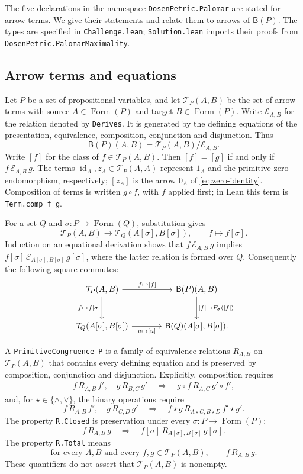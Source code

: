 \documentclass[11pt]{article}
\newcommand{\B}{\mathsf B}
\newcommand{\FormulaSet}{\operatorname{Form}}
\begin{document}
The five declarations in the namespace \texttt{DosenPetric.Palomar}
are stated for arrow terms. We give their statements and relate them
to arrows of $\B(P)$. The types are specified in \texttt{Challenge.lean};
\texttt{Solution.lean} imports their proofs from
\texttt{DosenPetric.PalomarMaximality}.

\subsection{Arrow terms and equations}

Let $P$ be a set of propositional variables, and let
$\mathcal T_P(A,B)$ be the set of arrow terms with source
$A\in\FormulaSet(P)$ and target $B\in\FormulaSet(P)$.
Write $\mathcal E_{A,B}$ for the relation denoted by
\texttt{Derives}. It is generated by the defining equations of
the presentation, equivalence, composition, conjunction and
disjunction. Thus
\[
 \B(P)(A,B)=\mathcal T_P(A,B)/\mathcal E_{A,B}.
\]
Write $[f]$ for the class of $f\in\mathcal T_P(A,B)$.
Then $[f]=[g]$ if and only if $f\,\mathcal E_{A,B}\,g$.
The terms $\operatorname{id}_A,z_A\in\mathcal T_P(A,A)$ represent
$1_A$ and the primitive zero endomorphism, respectively; $[z_A]$ is
the arrow $0_A$ of
\eqref{eq:zero-identity}. Composition of terms is written $g\circ f$,
with $f$ applied first; in Lean this term is \texttt{Term.comp f g}.

For a set $Q$ and $\sigma:P\to\FormulaSet(Q)$, substitution gives
\[
 \mathcal T_P(A,B)\longrightarrow
 \mathcal T_Q(A[\sigma],B[\sigma]),\qquad f\longmapsto f[\sigma].
\]
Induction on an equational derivation shows that
$f\,\mathcal E_{A,B}\,g$ implies
$f[\sigma]\,\mathcal E_{A[\sigma],B[\sigma]}\,g[\sigma]$,
where the latter relation is formed over $Q$.
Consequently the following square commutes:
\[
\begin{tikzcd}[column sep=large,row sep=large]
 \mathcal T_P(A,B)\arrow[r,"{f\mapsto[f]}"]
   \arrow[d,"{f\mapsto f[\sigma]}"']
   &\B(P)(A,B)\arrow[d,"{[f]\mapsto F_\sigma([f])}"]\\
 \mathcal T_Q(A[\sigma],B[\sigma])
   \arrow[r,"{u\mapsto[u]}"']
   &\B(Q)(A[\sigma],B[\sigma]).
\end{tikzcd}
\]

A \texttt{PrimitiveCongruence P} is a family of equivalence relations
$R_{A,B}$ on $\mathcal T_P(A,B)$ that contains every defining equation
and is preserved by composition, conjunction and disjunction.
Explicitly, composition requires
\[
 \begin{gathered}
 f\,R_{A,B}\,f',\quad g\,R_{B,C}\,g'
 \quad\Longrightarrow\quad
 g\circ f\,R_{A,C}\,g'\circ f',
 \end{gathered}
\]
and, for $\star\in\{\wedge,\vee\}$, the binary operations require
\[
 f\,R_{A,B}\,f',\quad g\,R_{C,D}\,g'
 \quad\Longrightarrow\quad
 f\star g\,R_{A\star C,B\star D}\,f'\star g'.
\]
The property \texttt{R.Closed} is preservation under every
$\sigma:P\to\FormulaSet(P)$:
\[
 f\,R_{A,B}\,g
 \quad\Longrightarrow\quad
 f[\sigma]\,R_{A[\sigma],B[\sigma]}\,g[\sigma].
\]
The property \texttt{R.Total} means
\[
 \text{for every }A,B\text{ and every }f,g\in\mathcal T_P(A,B),
 \qquad f\,R_{A,B}\,g.
\]
These quantifiers do not assert that $\mathcal T_P(A,B)$ is nonempty.
\end{document}
